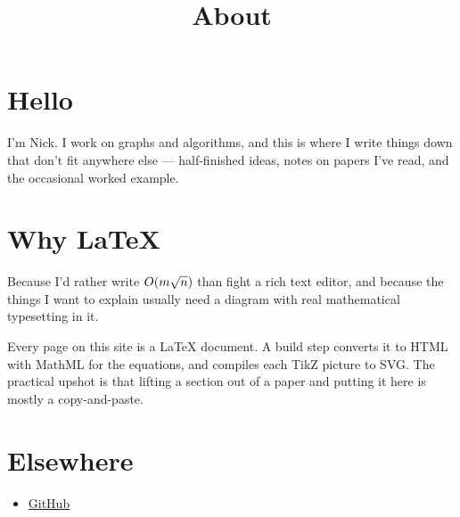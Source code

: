 \documentclass[11pt]{article}
\title{About}
\begin{document}
\section{Hello}

I'm Nick. I work on graphs and algorithms, and this is where I write things
down that don't fit anywhere else --- half-finished ideas, notes on papers I've
read, and the occasional worked example.

\section{Why LaTeX}

Because I'd rather write $O(m\sqrt{n})$ than fight a rich text editor, and
because the things I want to explain usually need a diagram with real
mathematical typesetting in it.

Every page on this site is a \LaTeX{} document. A build step converts it to
HTML with MathML for the equations, and compiles each TikZ picture to SVG. The
practical upshot is that lifting a section out of a paper and putting it here
is mostly a copy-and-paste.

\section{Elsewhere}

\begin{itemize}
  \item \href{https://github.com/nicknash}{GitHub}
\end{itemize}
\end{document}
